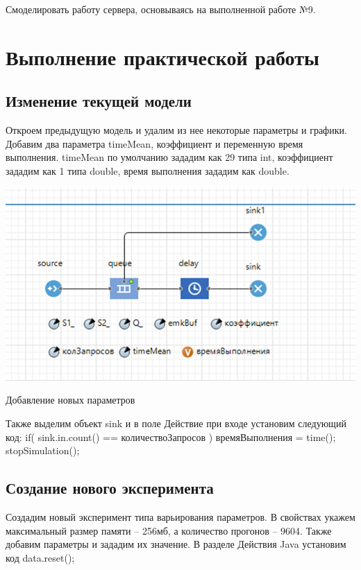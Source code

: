 \graphicspath{{./img}} %

Смоделировать работу сервера, основываясь на выполненной работе №9.


\section*{Выполнение практической работы}
\subsection{Изменение текущей модели}
Откроем предыдущую модель и удалим из нее некоторые параметры и графики.
Добавим два параметра timeMean, коэффициент и переменную время выполнения.
timeMean по умолчанию зададим как 29 типа int, коэффициент зададим как 1 типа double, время выполнения зададим как double.

\begin{image}
	\includegraphics[width=1\textwidth]{img1}
	\caption{Добавление новых параметров}
	\label{fig:model:res}
\end{image}

Также выделим объект sink и в поле Действие при входе установим следующий код:
if( sink.in.count() == количествоЗапросов ){ времяВыполнения = time(); stopSimulation();}

\clearpage

\subsection{Создание нового эксперимента}
Создадим новый эксперимент типа варьирования параметров.
В свойствах укажем максимальный размер памяти – 256мб, а количество прогонов – 9604.
Также добавим параметры и зададим их значение. В разделе Действия Java установим код data.reset();

